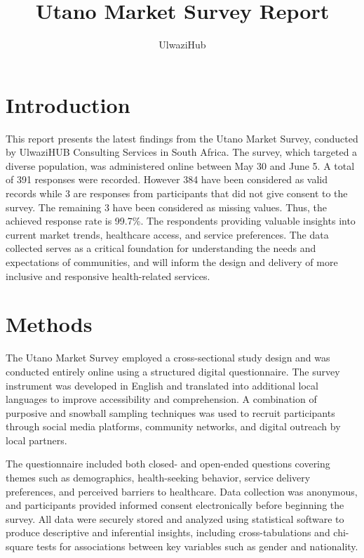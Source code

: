 \documentclass[
  letterpaper,
  DIV=11,
  numbers=noendperiod]{scrartcl}
\title{Utano Market Survey Report}
\author{UlwaziHub}
\date{}
\renewcommand*\contentsname{Table of contents}
\newcommand\contentsname{Table of contents}
\begin{document}
\maketitle

\renewcommand*\contentsname{Table of Contents}
{
\hypersetup{linkcolor=}
\setcounter{tocdepth}{3}
\tableofcontents
}

\section{Introduction}\label{introduction}

This report presents the latest findings from the Utano Market Survey,
conducted by UlwaziHUB Consulting Services in South Africa. The survey,
which targeted a diverse population, was administered online between May
30 and June 5. A total of 391 responses were recorded. However 384 have
been considered as valid records while 3 are responses from participants
that did not give consent to the survey. The remaining 3 have been
considered as missing values. Thus, the achieved response rate is
99.7\%. The respondents providing valuable insights into current market
trends, healthcare access, and service preferences. The data collected
serves as a critical foundation for understanding the needs and
expectations of communities, and will inform the design and delivery of
more inclusive and responsive health-related services.

\section{Methods}\label{methods}

The Utano Market Survey employed a cross-sectional study design and was
conducted entirely online using a structured digital questionnaire. The
survey instrument was developed in English and translated into
additional local languages to improve accessibility and comprehension. A
combination of purposive and snowball sampling techniques was used to
recruit participants through social media platforms, community networks,
and digital outreach by local partners.

The questionnaire included both closed- and open-ended questions
covering themes such as demographics, health-seeking behavior, service
delivery preferences, and perceived barriers to healthcare. Data
collection was anonymous, and participants provided informed consent
electronically before beginning the survey. All data were securely
stored and analyzed using statistical software to produce descriptive
and inferential insights, including cross-tabulations and chi-square
tests for associations between key variables such as gender and
nationality.
\end{document}
